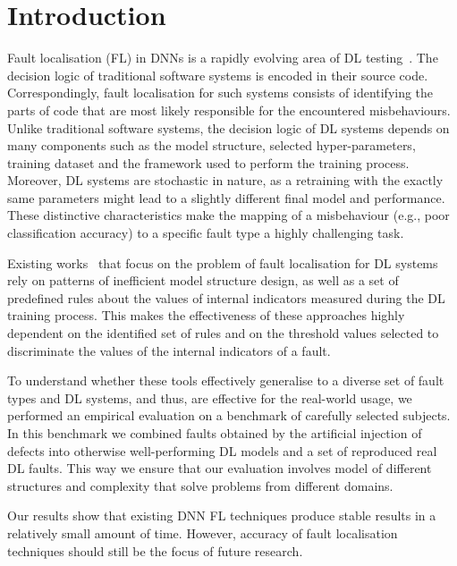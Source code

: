 
\section{Introduction}
\label{sec:intro}



Fault localisation (FL) in DNNs is a rapidly evolving area of DL testing~\cite{deeplocalize, wardat2022deepdiagnosis, deepfd,
nikanjam2021automatic, schoop2021umlaut}. The decision logic of traditional software systems is encoded in their source code. Correspondingly, fault localisation for such systems consists of identifying the parts of code that are most likely responsible for the encountered misbehaviours. Unlike traditional software systems, the decision logic of DL systems depends on many components such as the model structure, selected hyper-parameters, training dataset and the framework used to perform the training process. Moreover, DL systems are stochastic in nature, as a retraining with the exactly same parameters might lead to a slightly different final model and performance. These distinctive characteristics make the mapping of a misbehaviour (e.g., poor classification accuracy) to a specific fault type a highly challenging task.

Existing works~\cite{deeplocalize,autotrainer,wardat2022deepdiagnosis,bakerdetect,nikanjam2021automatic} that focus on the problem of fault localisation for DL systems rely on  patterns of inefficient model structure design, as well as a set of predefined rules about the values of internal indicators measured during the  DL training process. This makes the effectiveness of these approaches highly dependent on the identified set of rules and on the threshold values selected to discriminate the values of the internal indicators  of a fault.

To understand whether these tools effectively generalise to a diverse set of fault types and DL systems, and thus, are effective for the real-world usage, we performed an empirical evaluation on a benchmark of carefully selected subjects. In this benchmark we combined faults obtained by the artificial injection of defects into otherwise well-performing DL models and a set of reproduced real DL faults. This way we ensure that our evaluation involves model of different structures and complexity that solve problems from different domains. 

Our results show that existing DNN FL techniques produce stable results in a relatively small amount of time. However, accuracy of fault localisation techniques should still be the focus of future research.
